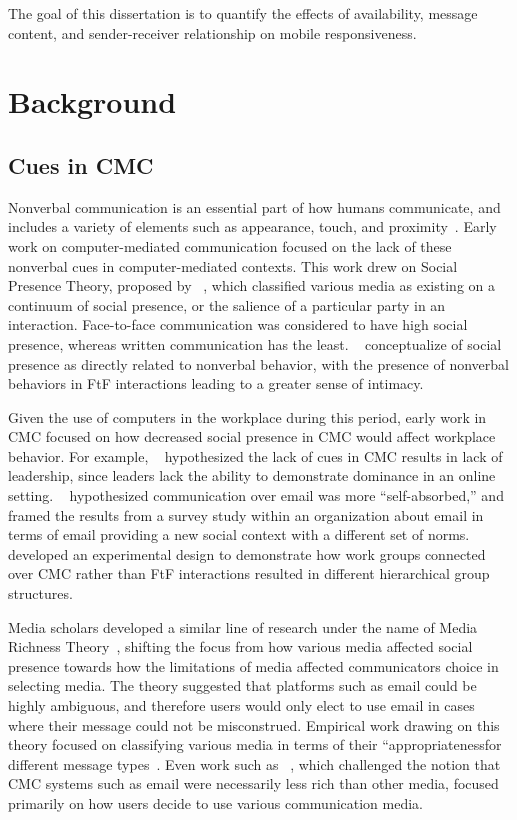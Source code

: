 \documentclass[12pt]{nuthesis}	%
\begin{document}
The goal of this dissertation is to quantify the effects of availability, message content, and sender-receiver relationship on mobile responsiveness. 

\chapter{Background}

\section{Cues in CMC}

Nonverbal communication is an essential part of how humans communicate, and includes a variety of elements such as appearance, touch, and proximity~\citep{burgoon2016nonverbal}. Early work on computer-mediated communication focused on the lack of these nonverbal cues in computer-mediated contexts. This work drew on Social Presence Theory, proposed by ~\citet{short1976social}, which classified various media as existing on a continuum of social presence, or the salience of a particular party in an interaction. Face-to-face communication was considered to have high social presence, whereas written communication has the least. ~\citet{burgoon1984relational} conceptualize of social presence as directly related to nonverbal behavior, with the presence of nonverbal behaviors in FtF interactions leading to a greater sense of intimacy.

Given the use of computers in the workplace during this period, early work in CMC focused on how decreased social presence in CMC would affect workplace behavior. For example, ~\citet{kiesler1984social} hypothesized  the lack of cues in CMC results in lack of leadership, since leaders lack the ability  to demonstrate dominance in an online setting. ~\citet{sproull1986reducing} hypothesized  communication  over email was more ``self-absorbed,'' and framed the results from a survey study  within an organization about email in terms of email providing a new social context  with a different set of norms. ~\citet{dubrovsky1991equalization} developed an experimental design to demonstrate how work groups connected over CMC rather  than  FtF interactions resulted  in different hierarchical group structures.

Media scholars developed a similar line of research under the name of Media Richness Theory~\citep{daft1986organizational}, shifting the focus from how various media affected social presence towards how the limitations of media affected communicators choice in selecting media. The theory suggested that platforms such as email could be highly ambiguous, and therefore users would only elect to use email in cases where their message could not be misconstrued. Empirical work drawing on this theory focused on classifying various media in terms of their ``appropriatenessfor different message types~\citep[e.g.][]{rice1993media}. Even work such as ~\citet{panteli2002richness}, which challenged the notion that CMC systems such as email were necessarily less rich than other media, focused primarily on how users decide to use various communication media.
\end{document}
